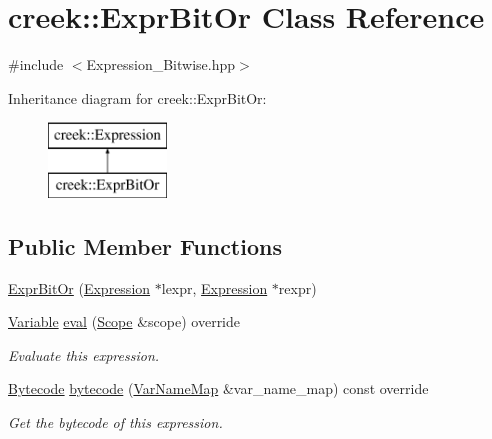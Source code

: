 \hypertarget{classcreek_1_1_expr_bit_or}{}\section{creek\+:\+:Expr\+Bit\+Or Class Reference}
\label{classcreek_1_1_expr_bit_or}


{\ttfamily \#include $<$Expression\+\_\+\+Bitwise.\+hpp$>$}

Inheritance diagram for creek\+:\+:Expr\+Bit\+Or\+:\begin{figure}[H]
\begin{center}
\leavevmode
\includegraphics[height=2.000000cm]{classcreek_1_1_expr_bit_or}
\end{center}
\end{figure}
\subsection*{Public Member Functions}
\begin{DoxyCompactItemize}
\item 
\hyperlink{classcreek_1_1_expr_bit_or_abd83c2cc1d407ff2144adae0f4fe91a3}{Expr\+Bit\+Or} (\hyperlink{classcreek_1_1_expression}{Expression} $\ast$lexpr, \hyperlink{classcreek_1_1_expression}{Expression} $\ast$rexpr)
\item 
\hyperlink{classcreek_1_1_variable}{Variable} \hyperlink{classcreek_1_1_expr_bit_or_a9066c33c5d0f95d39d4bab927dfd9a93}{eval} (\hyperlink{classcreek_1_1_scope}{Scope} \&scope) override
\begin{DoxyCompactList}\small\item\em Evaluate this expression. \end{DoxyCompactList}\item 
\hyperlink{classcreek_1_1_bytecode}{Bytecode} \hyperlink{classcreek_1_1_expr_bit_or_a20322a55b746c8c80e3d983e5fd1ffe3}{bytecode} (\hyperlink{classcreek_1_1_var_name_map}{Var\+Name\+Map} \&var\+\_\+name\+\_\+map) const  override\hypertarget{classcreek_1_1_expr_bit_or_a20322a55b746c8c80e3d983e5fd1ffe3}{}\label{classcreek_1_1_expr_bit_or_a20322a55b746c8c80e3d983e5fd1ffe3}

\begin{DoxyCompactList}\small\item\em Get the bytecode of this expression. \end{DoxyCompactList}\end{DoxyCompactItemize}


